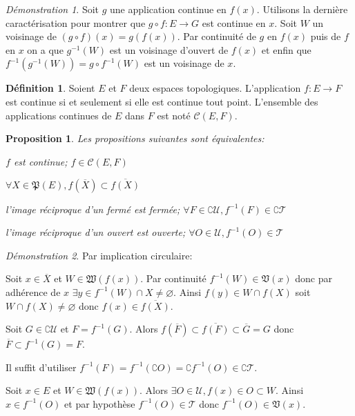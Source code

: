 \documentclass[a4paper, 11pt, french]{book}
\newenvironment{itemise}{\itemize}{\enditemize}
\theoremstyle{plain} %
\newtheorem{proposition}{Proposition}
\theoremstyle{definition} %
\newtheorem{definition}{Définition}
\theoremstyle{remark} %
\newtheorem*{demonstration}{Démonstration}
\newcommand{\1}{\mathds{1}}
\newcommand\vide{\varnothing}
\newcommand{\inv}[1]{#1^{-1}}
\renewcommand{\cal}[1]{\mathcal{#1}}
\renewcommand{\frak}[1]{\mathfrak{#1}}
\newcommand{\scr}[1]{\mathscr{#1}}
\begin{document}
\begin{demonstration}
	Soit $g$ une application continue en $f(x)$.
	Utilisons la dernière caractérisation pour montrer que $g\circ f:E\rightarrow G$ est continue en $x$.
	Soit $W$ un voisinage de $(g\circ f)(x)=g(f(x))$.
	Par continuité de $g$ en $f(x)$ puis de $f$ en $x$ on a que $\inv{g}(W)$ est un voisinage d'ouvert de $f(x)$ et enfin que $\inv{f}(\inv{g}(W))=\inv{g\circ f}(W)$ est un voisinage de $x$.
\end{demonstration}

\begin{definition}
	Soient $E$ et $F$ deux espaces topologiques.
	L'application $f\colon E\rightarrow F$ est continue si et seulement si elle est continue tout point.
	L'ensemble des applications continues de $E$ dans $F$ est noté $\mathcal{C}(E, F)$.
\end{definition}

\begin{proposition}
	Les propositions suivantes sont équivalentes:
	\begin{itemise}
		\item $f$ est continue; $f\in\cal{C}(E, F)$
		\item $\forall X\in\frak{P}(E), f(\overline{X})\subset\overline{f(X)}$
		\item l'image réciproque d'un fermé est fermée; $\forall F\in\complement\scr{U}, \inv{f}(F)\in\complement\scr{T}$
		\item l'image réciproque d'un ouvert est ouverte; $\forall O\in\scr{U}, \inv{f}(O)\in\scr{T}$
	\end{itemise}
\end{proposition}

\begin{demonstration}
	Par implication circulaire:
	\begin{itemise}
		\item Soit $x\in\overline{X}$ et $W\in\frak{W}(f(x))$.
		Par continuité $\inv{f}(W)\in\frak{V}(x)$ donc par adhérence de $x$ $\exists y\in\inv{f}(W)\cap X\neq\vide$.
		Ainsi $f(y)\in W\cap f(X)$ soit $W\cap f(X)\neq\vide$ donc $f(x)\in\overline{f(X)}$.
		\item Soit $G\in\complement\scr{U}$ et $F=\inv{f}(G)$.
		Alors $f(\overline{F})\subset\overline{f(F)}\subset\overline{G}=G$ donc $\overline{F}\subset\inv{f}(G)=F$.
		\item Il suffit d'utiliser $\inv{f}(F)=\inv{f}(\complement O)=\complement\inv{f}(O)\in\complement\scr{T}$.
		\item Soit $x\in E$ et $W\in\frak{W}(f(x))$.
		Alors $\exists O\in\scr{U}, f(x)\in O\subset W$.
		Ainsi $x\in\inv{f}(O)$ et par hypothèse $\inv{f}(O)\in\scr{T}$ donc $\inv{f}(O)\in\frak{V}(x)$.
	\end{itemise}
\end{demonstration}
\end{document}
